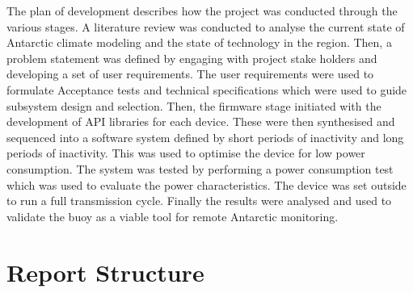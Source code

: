 The plan of development describes how the project was conducted through the various stages. A literature review was conducted to analyse the current state of Antarctic climate modeling and the state of technology in the region. Then, a problem statement was defined by engaging with project stake holders and developing a set of user requirements. The user requirements were used to formulate Acceptance tests and technical specifications which were used to guide subsystem design and selection. Then, the firmware stage initiated with the development of API libraries for each device. These were then synthesised and sequenced into a software system defined by short periods of inactivity and long periods of inactivity. This was used to optimise the device for low power consumption. The system was tested by performing a power consumption test which was used to evaluate the power characteristics. The device was set outside to run a full transmission cycle. Finally the results were analysed and used to validate the buoy as a viable tool for remote Antarctic monitoring.
\pagebreak
\section{Report Structure}

